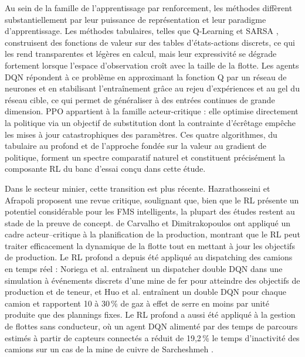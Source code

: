 \documentclass[11pt,a4paper]{article}
\newif\ifrevmarks
\newcommand{\revtag}[1]{\ifrevmarks\textsuperscript{\textcolor{red!70!black}{\scriptsize[#1]}}\fi}
\newcommand{\rev}[2]{\ifrevmarks{\color{revcolor}#2}\revtag{#1}\else#2\fi}
\newif\ifcorrmarks
\newcommand{\corr}[1]{\ifcorrmarks\textcolor{corrcolor}{#1}\else#1\fi}
\begin{document}
Au sein de la famille de l'apprentissage par renforcement, les méthodes diffèrent substantiellement par leur puissance de représentation et leur paradigme d'apprentissage. \rev{m5}{Les méthodes tabulaires, telles que Q-Learning et SARSA \cite{RichardSutton2018},} construisent des fonctions de valeur sur des tables d'états-actions discrets, ce qui les rend transparentes et légères en calcul, mais leur expressivité se dégrade fortement lorsque l'espace d'observation croît avec la taille de la flotte. Les agents DQN répondent à ce problème en approximant la fonction Q par un réseau de neurones et en stabilisant l'entraînement grâce au rejeu d'expériences et au gel du réseau cible, ce qui permet de généraliser à des entrées continues de grande dimension. PPO \cite{JohnSchulman2017} appartient à la famille acteur-critique : elle optimise directement la politique via un objectif de substitution dont la contrainte d'écrêtage empêche les mises à jour catastrophiques des paramètres. Ces quatre algorithmes, du tabulaire au profond et de l'approche fondée sur la valeur au gradient de politique, forment un spectre comparatif naturel et constituent précisément la composante RL du banc d'essai conçu dans cette étude.

Dans le secteur minier, cette transition est plus récente. Hazrathosseini et Afrapoli \cite{Hazrathosseini2024} proposent une revue critique, soulignant que, bien que le RL présente un potentiel considérable pour les FMS intelligents, la plupart des études restent au stade de la preuve de concept. de Carvalho et Dimitrakopoulos \cite{deCarvalho2023} ont appliqué un cadre acteur--critique à la planification de la production, montrant que le RL peut traiter efficacement la dynamique de la flotte tout en mettant à jour les objectifs de production. \corr{Le RL profond a depuis été appliqué au dispatching des camions en temps réel : Noriega et al. \cite{Noriega2025} entraînent un dispatcher double DQN dans une simulation à événements discrets d'une mine de fer pour atteindre des objectifs de production et de teneur, et Huo et al. \cite{Huo2024} entraînent un double DQN pour chaque camion et rapportent 10 à 30\,\% de gaz à effet de serre en moins par unité produite que des plannings fixes. Le RL profond a aussi été appliqué à la gestion de flottes sans conducteur, où un agent DQN alimenté par des temps de parcours estimés à partir de capteurs connectés a réduit de 19,2\,\% le temps d'inactivité des camions sur un cas de la mine de cuivre de Sarcheshmeh \cite{Badakhshan2025}.}
\end{document}
